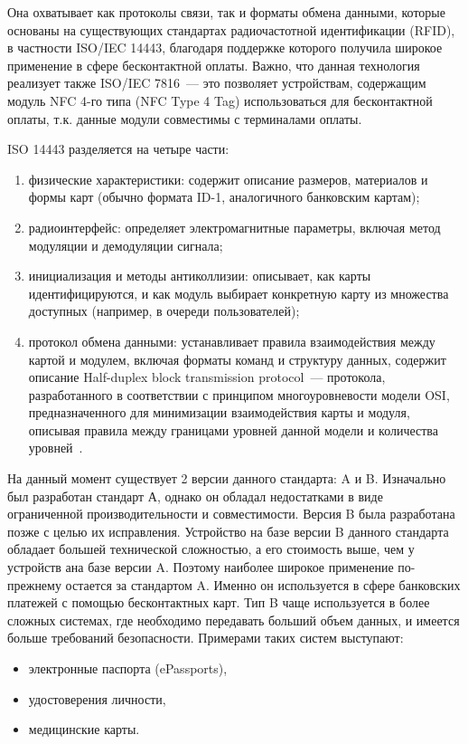 Она охватывает как протоколы связи, так и форматы обмена данными, которые основаны на существующих стандартах радиочастотной идентификации (RFID), в частности ISO/IEC 14443, благодаря поддержке которого получила широкое применение в сфере бесконтактной оплаты.
Важно, что данная технология реализует также ISO/IEC 7816~--- это позволяет устройствам, содержащим модуль NFC 4-го типа (NFC Type 4 Tag) использоваться для бесконтактной оплаты, т.к. данные модули совместимы с терминалами оплаты.

ISO 14443 разделяется на четыре части:

\begin{enumerate}
    \item физические характеристики: содержит описание размеров, материалов и формы карт (обычно формата ID-1, аналогичного банковским картам);
    \item радиоинтерфейс: определяет электромагнитные параметры, включая метод модуляции и демодуляции сигнала;
    \item инициализация и методы антиколлизии: описывает, как карты идентифицируются, и как модуль выбирает конкретную карту из множества доступных (например, в очереди пользователей);
    \item протокол обмена данными: устанавливает правила взаимодействия между картой и модулем, включая форматы команд и структуру данных, содержит описание Half-duplex block transmission protocol~--- протокола, разработанного в соответствии с принципом многоуровневости модели OSI, предназначенного для минимизации взаимодействия карты и модуля, описывая правила между границами уровней данной модели и количества уровней~\cite{iso_14443_en}.
\end{enumerate}


На данный момент существует 2 версии данного стандарта: A и B.
Изначально был разработан стандарт А, однако он обладал недостатками в виде ограниченной производительности и совместимости.
Версия B была разработана позже с целью их исправления.
Устройство на базе версии B данного стандарта обладает большей технической сложностью, а его стоимость выше, чем у устройств ана базе версии A.
Поэтому наиболее широкое применение по-прежнему остается за стандартом A.
Именно он используется в сфере банковских платежей с помощью бесконтактных карт.
Тип B чаще используется в более сложных системах, где необходимо передавать больший объем данных, и имеется больше требований безопасности.
Примерами таких систем выступают:

\begin{itemize}
    \item электронные паспорта (ePassports),
    \item удостоверения личности,
    \item медицинские карты.
\end{itemize}

